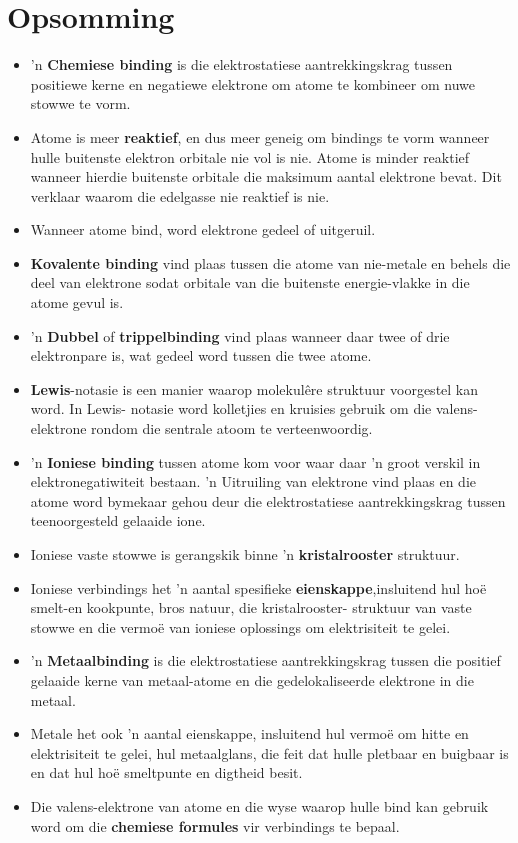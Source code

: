             \section{Opsomming}
            \nopagebreak
      \label{m38689*id147386}\begin{itemize}[noitemsep]
            \label{m38689*uid136}\item 'n \textbf{Chemiese binding} is die elektrostatiese aantrekkingskrag tussen positiewe kerne en negatiewe elektrone om atome te kombineer om nuwe stowwe te vorm.
\label{m38689*uid137}\item Atome is meer \textbf{reaktief}, en dus meer geneig om bindings te vorm wanneer hulle buitenste elektron orbitale nie vol is nie. Atome is minder reaktief wanneer hierdie buitenste orbitale die maksimum aantal elektrone bevat. Dit verklaar waarom die edelgasse nie reaktief is nie.
\label{m38689*uid142}\item Wanneer atome bind, word elektrone gedeel of uitgeruil.
\label{m38689*uid143}\item \textbf{Kovalente binding} vind plaas tussen die atome van nie-metale en behels die deel van elektrone sodat orbitale van die buitenste energie-vlakke in die atome gevul is.
\label{m38689*uid145}\item 'n \textbf{Dubbel} of \textbf{trippelbinding} vind plaas wanneer daar twee of drie elektronpare is, wat gedeel word tussen die twee atome.
\label{m38689*uid147}\item \textbf{Lewis}-notasie is een manier waarop molekulêre struktuur voorgestel kan word. In Lewis- notasie word kolletjies en kruisies gebruik om die valens-elektrone rondom die sentrale atoom te verteenwoordig.
\label{m38689*uid150}\item 'n \textbf{Ioniese binding} tussen atome kom voor waar daar 'n groot verskil in elektronegatiwiteit bestaan. 'n Uitruiling van elektrone vind plaas en die atome word bymekaar gehou deur die elektrostatiese  aantrekkingskrag tussen teenoorgesteld gelaaide ione.
\label{m38689*uid151}\item Ioniese vaste stowwe is gerangskik binne 'n \textbf{kristalrooster} struktuur.
\label{m38689*uid152}\item Ioniese verbindings het 'n aantal spesifieke \textbf{eienskappe},insluitend hul hoë smelt-en kookpunte, bros natuur, die kristalrooster- struktuur van vaste stowwe en die vermo\"{e} van ioniese oplossings om elektrisiteit te gelei.
\label{m38689*uid153}\item 'n \textbf{Metaalbinding} is die elektrostatiese aantrekkingskrag tussen die positief gelaaide kerne van metaal-atome en die gedelokaliseerde elektrone in die metaal.
\label{m38689*uid154}\item Metale het ook 'n aantal eienskappe, insluitend hul vermo\"{e} om hitte en elektrisiteit te gelei, hul metaalglans, die feit dat hulle pletbaar en buigbaar is en dat hul ho\"{e} smeltpunte en digtheid besit.
\label{m38689*uid155}\item Die valens-elektrone van atome en die wyse waarop hulle bind kan gebruik word om die \textbf{chemiese formules} vir verbindings te bepaal.
\end{itemize}
